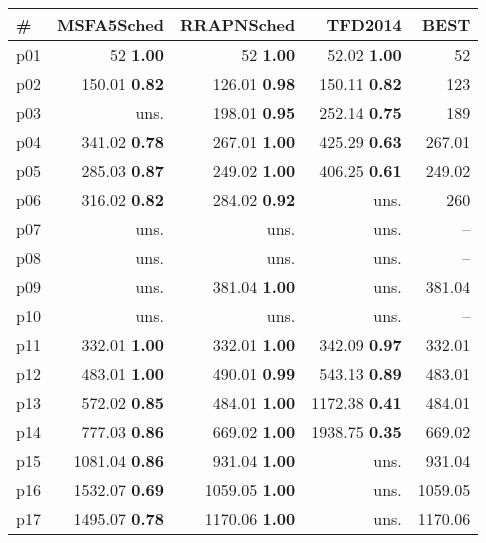 \begin{tabular}{|l|rrr|r|}
\hline
\textbf{\#} & \textbf{MSFA5Sched} & \textbf{RRAPNSched} & \textbf{TFD2014} & \textbf{BEST}\\
\hline
p01 & {\footnotesize 52} \textbf{1.00} & {\footnotesize 52} \textbf{1.00} & {\footnotesize 52.02} \textbf{1.00} & 52\\
p02 & {\footnotesize 150.01} \textbf{0.82} & {\footnotesize 126.01} \textbf{0.98} & {\footnotesize 150.11} \textbf{0.82} & 123\\
p03 & uns. & {\footnotesize 198.01} \textbf{0.95} & {\footnotesize 252.14} \textbf{0.75} & 189\\
p04 & {\footnotesize 341.02} \textbf{0.78} & {\footnotesize 267.01} \textbf{1.00} & {\footnotesize 425.29} \textbf{0.63} & 267.01\\
p05 & {\footnotesize 285.03} \textbf{0.87} & {\footnotesize 249.02} \textbf{1.00} & {\footnotesize 406.25} \textbf{0.61} & 249.02\\
p06 & {\footnotesize 316.02} \textbf{0.82} & {\footnotesize 284.02} \textbf{0.92} & uns. & 260\\
p07 & uns. & uns. & uns. & --\\
p08 & uns. & uns. & uns. & --\\
p09 & uns. & {\footnotesize 381.04} \textbf{1.00} & uns. & 381.04\\
p10 & uns. & uns. & uns. & --\\
p11 & {\footnotesize 332.01} \textbf{1.00} & {\footnotesize 332.01} \textbf{1.00} & {\footnotesize 342.09} \textbf{0.97} & 332.01\\
p12 & {\footnotesize 483.01} \textbf{1.00} & {\footnotesize 490.01} \textbf{0.99} & {\footnotesize 543.13} \textbf{0.89} & 483.01\\
p13 & {\footnotesize 572.02} \textbf{0.85} & {\footnotesize 484.01} \textbf{1.00} & {\footnotesize 1172.38} \textbf{0.41} & 484.01\\
p14 & {\footnotesize 777.03} \textbf{0.86} & {\footnotesize 669.02} \textbf{1.00} & {\footnotesize 1938.75} \textbf{0.35} & 669.02\\
p15 & {\footnotesize 1081.04} \textbf{0.86} & {\footnotesize 931.04} \textbf{1.00} & uns. & 931.04\\
p16 & {\footnotesize 1532.07} \textbf{0.69} & {\footnotesize 1059.05} \textbf{1.00} & uns. & 1059.05\\
p17 & {\footnotesize 1495.07} \textbf{0.78} & {\footnotesize 1170.06} \textbf{1.00} & uns. & 1170.06\\

\end{tabular}
